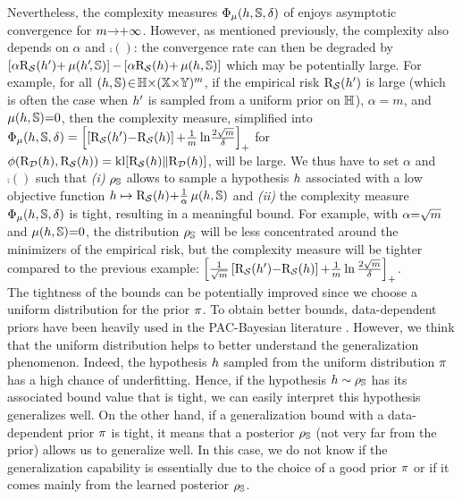Nevertheless, the complexity measures $\PhiComp(\h,\S,\delta)$ of  enjoys asymptotic convergence for $\m {\rightarrow} {+}\infty$.
However, as mentioned previously, the complexity also depends on 
$\alpha$ and $\comp()$: the convergence rate can then be degraded by $\LB \alpha\Risk_{\dS}(\h') {+} \comp(\h'\!, \S)\RB{-}\LB\alpha\Risk_{\dS}(\h){+}\comp(\h, \S)\RB$ which may be potentially large.
For example, for all $(\h,\S)\!\in\!\H{\times}(\X{\times}\Y)^\m$, if the empirical risk $\Risk_{\dS}(\h')$ is large (which is often the case when $\h'$ is sampled from a uniform prior on $\H$), $\alpha{=}m$, and $\comp(\h,\S){=}0$, then the complexity measure, simplified into $\PhiComp(\h,\S,\delta)=\left[\left[\Risk_{\dS}(\h'){-}\Risk_{\dS}(\h)\right]{+}\frac{1}{\m}\ln\!\frac{2\sqrt{\m}}{\delta}\right]_+$ for $\phi(\Risk_{\D}(\h), \Risk_{\dS}(\h)) =\kl[\Risk_{\dS}(\h)\|\Risk_{\D}(\h)]$, will be large.
We thus have to set $\alpha$ and $\comp()$ such that {\it (i)}  $\AQ$ allows to sample a hypothesis $\h$ associated with a low objective function $\h\mapsto \Risk_{\dS}(\h) {+} \frac{1}{\alpha}\comp(\h,\S)$  and {\it (ii)} the complexity measure $\PhiComp(\h, \S, \delta)$ is tight, resulting in a meaningful bound. 
For example, with $\alpha{=}\sqrt{\m}$ and $\comp(\h,\S){=}0$, the distribution $\AQ$ will be less concentrated around the minimizers of the empirical risk, but the complexity measure will be tighter compared to the previous example:  $\left[\frac{1}{\sqrt{\m}}\left[\Risk_{\dS}(\h'){-}\Risk_{\dS}(\h)\right]{+}\frac{1}{\m}\ln\frac{2\sqrt{\m}}{\delta}\right]_+$.\\

The tightness of the bounds can be potentially improved since we choose a uniform distribution for the prior $\P$.
To obtain better bounds, data-dependent priors have been heavily used in the PAC-Bayesian literature \citep[see \eg,][]{ParradoHernandezAmbroladzeShaweTaylorSun2012,DziugaiteHsuGharbiehArpinoRoy2021,PerezOrtizRivasplataShaweTaylorSzepesvari2021}.
However, we think that the uniform distribution helps to better understand the generalization phenomenon.
Indeed, the hypothesis $\h$ sampled from the uniform distribution $\P$ has a high chance of underfitting.
Hence, if the hypothesis $\h\sim\AQ$ has its associated bound value that is tight, we can easily interpret this hypothesis generalizes well.
On the other hand, if a generalization bound with a data-dependent prior $\P$ is tight, it means that a posterior $\AQ$ (not very far from the prior) allows us to generalize well. 
In this case, we do not know if the generalization capability is essentially due to the choice of a good prior $\P$ or if it comes mainly from the learned posterior $\AQ$.\\

